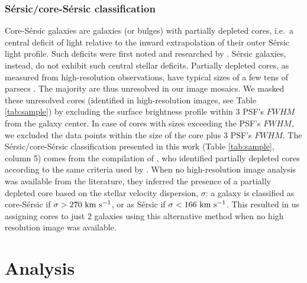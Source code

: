 \documentclass[preprint2]{emulateapj}
\begin{document}
\subsubsection{S\'ersic/core-S\'ersic classification}
\label{sec:corser}
Core-S\'ersic galaxies \citep{grahamguzman2003,graham2003coresersicmodel,trujillo2004coresersicmodel} are galaxies (or bulges) 
with partially depleted cores, 
i.e.~a central deficit of light relative to the inward extrapolation of their outer S\'ersic light profile. 
Such deficits were first noted and researched by \cite{kingminkowski1966}.
S\'ersic galaxies, instead, do not exhibit such central stellar deficits.
Partially depleted cores, as measured from high-resolution observations, have typical sizes of a few tens of parsecs
\citep{dullograham2014cores,rusli2013}.
The majority are thus unresolved in our image mosaics. 
We masked these unresolved cores (identified in high-resolution images, see Table \ref{tab:sample}) by excluding the surface brightness profile 
within 3 PSF's $FWHM$ from the galaxy center.
In case of cores with sizes exceeding the PSF's $FWHM$, we excluded the data points within the size of the core 
plus 3 PSF's $FWHM$.
The S\'ersic/core-S\'ersic classification presented in this work (Table \ref{tab:sample}, column 5)
comes from the compilation of \citet{savorgnangraham2014},
who identified partially depleted cores according to the same criteria used by \citet{grahamscott2013}.
When no high-resolution image analysis was available from the literature, 
they inferred the presence of a partially depleted core based on the stellar velocity dispersion, $\sigma$:
a galaxy is classified as core-S\'ersic if $\sigma > 270\rm~km~s^{-1}$,
or as S\'ersic if $\sigma < 166\rm~km~s^{-1}$.
This resulted in us assigning cores to just 2 galaxies using this alternative method when 
no high resolution image was available.

\section{Analysis}
\label{sec:anal}
\end{document}
